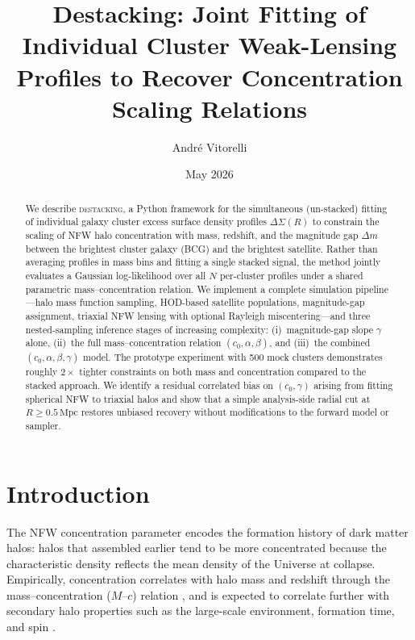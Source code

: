 \documentclass[12pt,a4paper]{article}
\title{\textbf{Destacking: Joint Fitting of Individual Cluster Weak-Lensing Profiles to Recover Concentration Scaling Relations}}
\author{Andr\'e Vitorelli}
\date{May 2026}
\begin{document}
\maketitle

\begin{abstract}
  We describe \textsc{destacking}, a Python framework for the simultaneous (un-stacked) fitting
  of individual galaxy cluster excess surface density profiles $\Delta\Sigma(R)$ to constrain
  the scaling of NFW halo concentration with mass, redshift, and the magnitude gap
  $\Delta m$ between the brightest cluster galaxy (BCG) and the brightest satellite.
  Rather than averaging profiles in mass bins and fitting a single stacked signal, the
  method jointly evaluates a Gaussian log-likelihood over all $N$ per-cluster profiles
  under a shared parametric mass--concentration relation.  We implement a complete
  simulation pipeline—halo mass function sampling, HOD-based satellite populations,
  magnitude-gap assignment, triaxial NFW lensing with optional Rayleigh
  miscentering—and three nested-sampling inference stages of increasing complexity:
  (i)~magnitude-gap slope $\gamma$ alone, (ii)~the full mass--concentration relation
  $(c_0, \alpha, \beta)$, and (iii)~the combined $(c_0, \alpha, \beta, \gamma)$ model.
  The prototype experiment with 500 mock clusters demonstrates roughly $2\times$ tighter
  constraints on both mass and concentration compared to the stacked approach.  We
  identify a residual correlated bias on $(c_0, \gamma)$ arising from fitting spherical
  NFW to triaxial halos and show that a simple analysis-side radial cut at
  $R \ge 0.5\,\mathrm{Mpc}$ restores unbiased recovery without modifications to the
  forward model or sampler.
\end{abstract}

\tableofcontents
\newpage

\section{Introduction}
\label{sec:intro}

The NFW concentration parameter \citep{Navarro1996, Navarro1997} encodes the formation
history of dark matter halos: halos that assembled earlier tend to be more concentrated
because the characteristic density reflects the mean density of the Universe at
collapse.  Empirically, concentration correlates with halo mass and redshift through the
mass--concentration ($M$--$c$) relation \citep{DuttonMaccio2014,Diemer2019}, and is
expected to correlate further with secondary halo properties such as the large-scale
environment, formation time, and spin \citep{Gao2005,Wechsler2006}.
\end{document}
